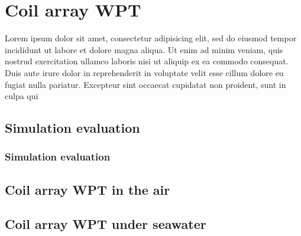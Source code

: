 \chapter{Coil array WPT}
 Lorem ipsum dolor sit amet, consectetur adipisicing elit,
 sed do eiusmod tempor incididunt ut labore et dolore magna aliqua.
 Ut enim ad minim veniam, quis nostrud exercitation ullamco laboris nisi ut aliquip ex ea commodo consequat.
 Duis aute irure dolor in reprehenderit in voluptate velit esse cillum dolore eu fugiat nulla pariatur.
 Excepteur sint occaecat cupidatat non proident, sunt in culpa qui
 \section{Simulation evaluation}
 \subsection{Simulation evaluation}
 \section{Coil array WPT in the air}

 \section{Coil array WPT under seawater}